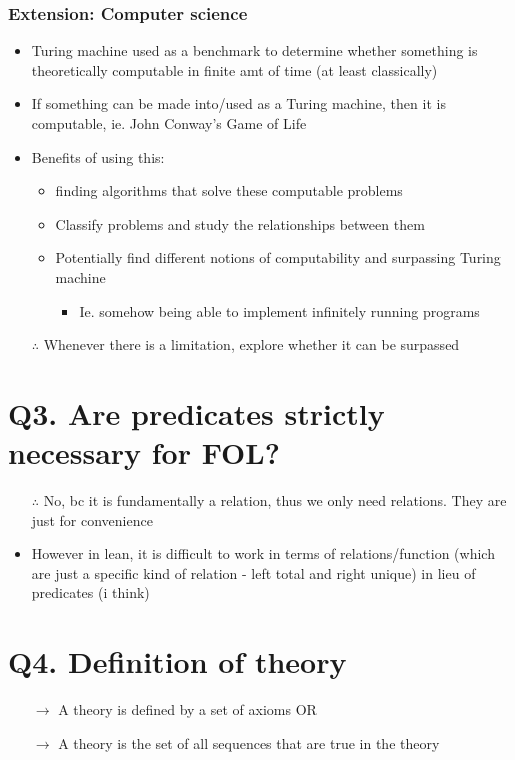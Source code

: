 \documentclass{article}
\begin{document}
\subsubsection*{Extension: Computer science}
\begin{itemize}
  \item Turing machine used as a benchmark to determine whether something is theoretically computable in finite amt of time (at least classically)
  \item If something can be made into/used as a Turing machine, then it is computable, ie. John Conway’s Game of Life
  \item Benefits of using this: 
  \begin{itemize}
    \item finding algorithms that solve these computable problems
    \item Classify problems and study the relationships between them
    \item Potentially find different notions of computability and surpassing Turing machine
    \begin{itemize}
      \item Ie. somehow being able to implement infinitely running programs
    \end{itemize}
  \end{itemize}
  \item[$\therefore$] Whenever there is a limitation, explore whether it can be surpassed
\end{itemize}

\section*{Q3. Are predicates strictly necessary for FOL?}
\begin{itemize}
  \item[$\therefore$] No, bc it is fundamentally a relation, thus we only need relations. They are just for convenience
  \item However in lean, it is difficult to work in terms of relations/function (which are just a specific kind of relation - left total and right unique) in lieu of predicates (i think)
\end{itemize}

\section*{Q4. Definition of theory}
\begin{itemize}
  \item[$\rightarrow$] A theory is defined by a set of axioms OR
  \item[$\rightarrow$] A theory is the set of all sequences that are true in the theory
\end{itemize}
\end{document}
